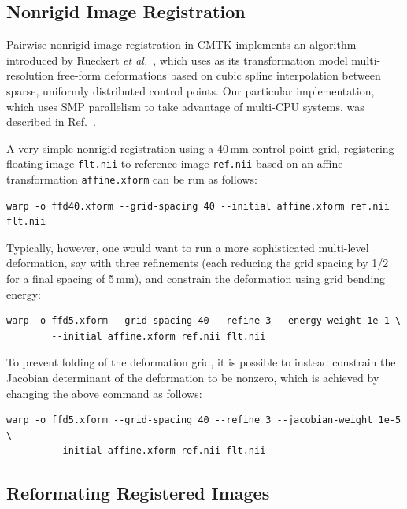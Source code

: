 \documentclass{InsightArticle}
\begin{document}
\subsection{Nonrigid Image Registration}

Pairwise nonrigid image registration in CMTK implements an algorithm
introduced by Rueckert {\em et al.\/}~\cite{RuecSonoHaye:1999}, which uses
as its transformation model multi-resolution free-form deformations based on
cubic spline interpolation between sparse, uniformly distributed control
points. Our particular implementation, which uses SMP parallelism to take
advantage of multi-CPU systems, was described in Ref.~\cite{RohlMaur:2003}.

A very simple nonrigid registration using a 40\,mm control point grid,
registering floating image \verb|flt.nii| to reference image \verb|ref.nii|
based on an affine transformation \verb|affine.xform| can be run as follows:
\begin{verbatim}
warp -o ffd40.xform --grid-spacing 40 --initial affine.xform ref.nii flt.nii
\end{verbatim}
Typically, however, one would want to run a more sophisticated multi-level
deformation, say with three refinements (each reducing the grid spacing by
1/2 for a final spacing of 5\,mm), and constrain the deformation using grid
bending energy:
\begin{verbatim}
warp -o ffd5.xform --grid-spacing 40 --refine 3 --energy-weight 1e-1 \
        --initial affine.xform ref.nii flt.nii
\end{verbatim}
To prevent folding of the deformation grid, it is possible to instead
constrain the Jacobian determinant of the deformation to be nonzero, which is
achieved by changing the above command as follows:
\begin{verbatim}
warp -o ffd5.xform --grid-spacing 40 --refine 3 --jacobian-weight 1e-5 \
        --initial affine.xform ref.nii flt.nii
\end{verbatim}

\subsection{Reformating Registered Images}
\end{document}
